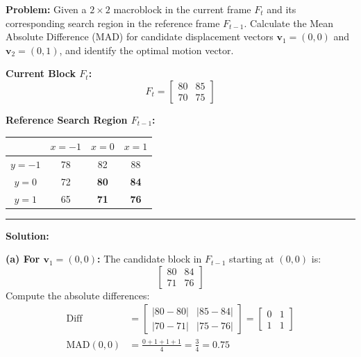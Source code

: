 \documentclass[12pt,a4paper]{article}
\renewcommand{\arraystretch}{1.45}
\begin{document}
\begin{tcolorbox}[examplebox, title={Motion Vector Estimation}]
\textbf{Problem:} Given a $2 \times 2$ macroblock in the current frame $F_t$ and its corresponding search region in the reference frame $F_{t-1}$. Calculate the Mean Absolute Difference (MAD) for candidate displacement vectors $\mathbf{v}_1 = (0,0)$ and $\mathbf{v}_2 = (0,1)$, and identify the optimal motion vector.

\par\vspace{6pt}\noindent
\begin{minipage}{0.42\textwidth}
  \centering
  \textbf{Current Block $F_t$:}
  \[
    F_t = \begin{bmatrix} 80 & 85 \\ 70 & 75 \end{bmatrix}
  \]
\end{minipage}
\hfill
\begin{minipage}{0.53\textwidth}
  \centering
  \textbf{Reference Search Region $F_{t-1}$:}
  \par\vspace{4pt}
  \small
  {\renewcommand{\arraystretch}{1.55}%
\begin{tabular}{|c|c|c|c|}\hline
& $x=-1$ & $x=0$ & $x=1$ \\
\hline
$y=-1$ & 78 & 82 & 88 \\
\hline
$y=0$  & 72 & \textbf{80} & \textbf{84} \\
\hline
$y=1$  & 65 & \textbf{71} & \textbf{76} \\
\hline
\end{tabular}
}
\end{minipage}
\par\vspace{6pt}

\par\noindent\rule{\linewidth}{0.5pt}\par
\textbf{Solution:}

\textbf{(a) For $\mathbf{v}_1 = (0,0)$:}
The candidate block in $F_{t-1}$ starting at $(0,0)$ is:
\[
  \begin{bmatrix} 80 & 84 \\ 71 & 76 \end{bmatrix}
\]
Compute the absolute differences:
\begin{align*}
  \text{Diff} &= \begin{bmatrix} |80 - 80| & |85 - 84| \\ |70 - 71| & |75 - 76| \end{bmatrix} = \begin{bmatrix} 0 & 1 \\ 1 & 1 \end{bmatrix} \\
  \text{MAD}(0,0) &= \frac{0 + 1 + 1 + 1}{4} = \frac{3}{4} = 0.75
\end{align*}


\end{tcolorbox}
\end{document}
